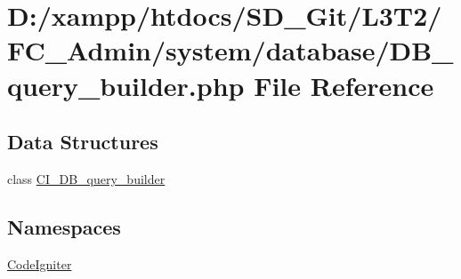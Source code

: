 \hypertarget{_admin_2system_2database_2_d_b__query__builder_8php}{}\section{D\+:/xampp/htdocs/\+S\+D\+\_\+\+Git/\+L3\+T2/\+F\+C\+\_\+\+Admin/system/database/\+D\+B\+\_\+query\+\_\+builder.php File Reference}
\label{_admin_2system_2database_2_d_b__query__builder_8php}
\subsection*{Data Structures}
\begin{DoxyCompactItemize}
\item 
class \hyperlink{class_c_i___d_b__query__builder}{C\+I\+\_\+\+D\+B\+\_\+query\+\_\+builder}
\end{DoxyCompactItemize}
\subsection*{Namespaces}
\begin{DoxyCompactItemize}
\item 
 \hyperlink{namespace_code_igniter}{Code\+Igniter}
\end{DoxyCompactItemize}
